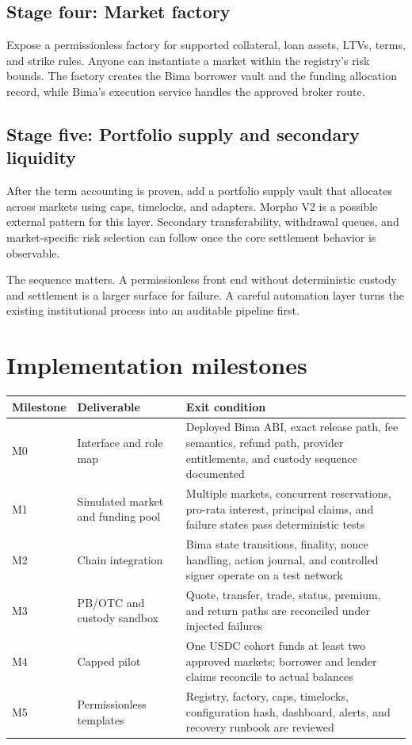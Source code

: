 \documentclass[11pt,oneside]{article}
\begin{document}
\subsection{Stage four: Market factory}

Expose a permissionless factory for supported collateral, loan assets, LTVs, terms, and strike rules. Anyone can instantiate a market within the registry's risk bounds. The factory creates the Bima borrower vault and the funding allocation record, while Bima's execution service handles the approved broker route.

\subsection{Stage five: Portfolio supply and secondary liquidity}

After the term accounting is proven, add a portfolio supply vault that allocates across markets using caps, timelocks, and adapters. Morpho V2 is a possible external pattern for this layer. Secondary transferability, withdrawal queues, and market-specific risk selection can follow once the core settlement behavior is observable.

The sequence matters. A permissionless front end without deterministic custody and settlement is a larger surface for failure. A careful automation layer turns the existing institutional process into an auditable pipeline first.

\section{Implementation milestones}

\begin{center}
\begin{tabularx}{\textwidth}{@{}p{}p{}Y@{}}
\toprule
\textbf{Milestone} & \textbf{Deliverable} & \textbf{Exit condition} \\
\midrule
M0 & Interface and role map & Deployed Bima ABI, exact release path, fee semantics, refund path, provider entitlements, and custody sequence documented \\
M1 & Simulated market and funding pool & Multiple markets, concurrent reservations, pro-rata interest, principal claims, and failure states pass deterministic tests \\
M2 & Chain integration & Bima state transitions, finality, nonce handling, action journal, and controlled signer operate on a test network \\
M3 & PB/OTC and custody sandbox & Quote, transfer, trade, status, premium, and return paths are reconciled under injected failures \\
M4 & Capped pilot & One USDC cohort funds at least two approved markets; borrower and lender claims reconcile to actual balances \\
M5 & Permissionless templates & Registry, factory, caps, timelocks, configuration hash, dashboard, alerts, and recovery runbook are reviewed \\
\bottomrule
\end{tabularx}
\end{center}
\end{document}
